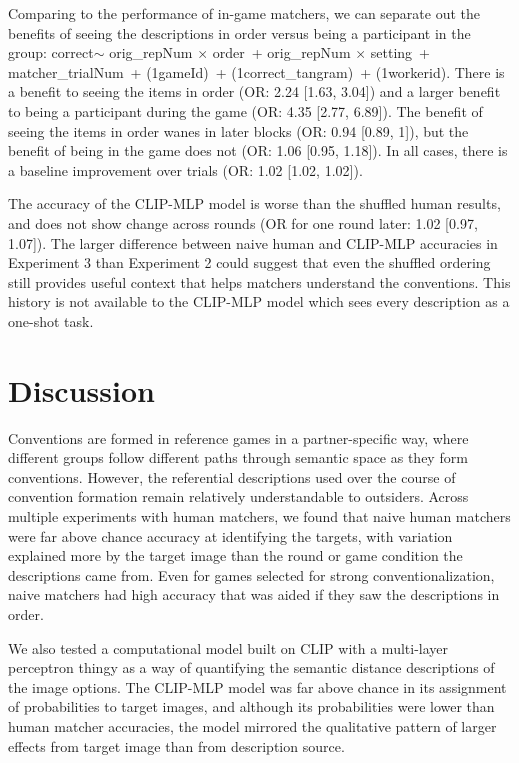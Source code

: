 \documentclass[10pt, letterpaper]{article}
\begin{document}
Comparing to the performance of in-game matchers, we can separate out
the benefits of seeing the descriptions in order versus being a
participant in the group: correct\(\sim\) orig\_repNum \(\times\)
order~+ orig\_repNum \(\times\) setting~+ matcher\_trialNum~+
(1\textbar gameId)~+ (1\textbar correct\_tangram)~+
(1\textbar workerid). There is a benefit to seeing the items in order
(OR: 2.24 {[}1.63, 3.04{]}) and a larger benefit to being a participant
during the game (OR: 4.35 {[}2.77, 6.89{]}). The benefit of seeing the
items in order wanes in later blocks (OR: 0.94 {[}0.89, 1{]}), but the
benefit of being in the game does not (OR: 1.06 {[}0.95, 1.18{]}). In
all cases, there is a baseline improvement over trials (OR: 1.02
{[}1.02, 1.02{]}).

The accuracy of the CLIP-MLP model is worse than the shuffled human
results, and does not show change across rounds (OR for one round later:
1.02 {[}0.97, 1.07{]}). The larger difference between naive human and
CLIP-MLP accuracies in Experiment 3 than Experiment 2 could suggest that
even the shuffled ordering still provides useful context that helps
matchers understand the conventions. This history is not available to
the CLIP-MLP model which sees every description as a one-shot task.

\section{Discussion}\label{discussion}

Conventions are formed in reference games in a partner-specific way,
where different groups follow different paths through semantic space as
they form conventions. However, the referential descriptions used over
the course of convention formation remain relatively understandable to
outsiders. Across multiple experiments with human matchers, we found
that naive human matchers were far above chance accuracy at identifying
the targets, with variation explained more by the target image than the
round or game condition the descriptions came from. Even for games
selected for strong conventionalization, naive matchers had high
accuracy that was aided if they saw the descriptions in order.

We also tested a computational model built on CLIP with a multi-layer
perceptron thingy as a way of quantifying the semantic distance
descriptions of the image options. The CLIP-MLP model was far above
chance in its assignment of probabilities to target images, and although
its probabilities were lower than human matcher accuracies, the model
mirrored the qualitative pattern of larger effects from target image
than from description source.
\end{document}
